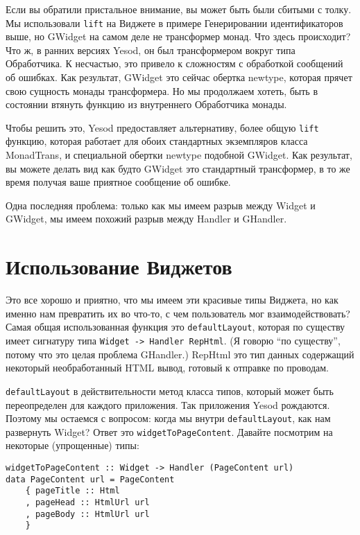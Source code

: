 Если вы обратили пристальное внимание, вы может быть были сбитыми с толку. Мы использовали \lstinline'lift' на Виджете в примере Генерировании идентификаторов выше, но GWidget на самом деле не трансформер монад. Что здесь происходит? Что ж, в ранних версиях Yesod, он был трансформером вокруг типа Обработчика. К несчастью, это привело к сложностям с обработкой сообщений об ошибках. Как результат, GWidget это сейчас обертка newtype, которая прячет свою сущность монады трансформера. Но мы продолжаем хотеть, быть в состоянии втянуть функцию из внутреннего Обработчика монады.

Чтобы решить это, Yesod предоставляет альтернативу, более общую \lstinline'lift' функцию, которая работает для обоих стандартных экземпляров класса MonadTrans, и специальной обертки newtype подобной GWidget. Как результат, вы можете делать вид как будто GWidget это стандартный трансформер, в то же время получая ваше приятное сообщение об ошибке.

Одна последняя проблема: только как мы имеем разрыв между Widget и GWidget, мы имеем похожий разрыв между Handler и GHandler.

\section{Использование Виджетов}

Это все хорошо и приятно, что мы имеем эти красивые типы Виджета, но как именно нам превратить их во что-то, с чем пользователь мог взаимодействовать? Самая общая использованная функция это \lstinline'defaultLayout', которая по существу имеет сигнатуру типа \lstinline'Widget -> Handler RepHtml'. (Я говорю \textquotedblleft по существу\textquotedblright, потому что это целая проблема GHandler.) RepHtml это тип данных содержащий некоторый необработанный HTML вывод, готовый к отправке по проводам.

\lstinline'defaultLayout' в действительности метод класса типов, который может быть переопределен для каждого приложения. Так приложения Yesod рождаются. Поэтому мы остаемся с вопросом: когда мы внутри \lstinline'defaultLayout', как нам развернуть Widget? Ответ это \lstinline'widgetToPageContent'. Давайте посмотрим на некоторые (упрощенные) типы:

\begin{lstlisting}
widgetToPageContent :: Widget -> Handler (PageContent url)
data PageContent url = PageContent
    { pageTitle :: Html
    , pageHead :: HtmlUrl url
    , pageBody :: HtmlUrl url
    }
\end{lstlisting}


